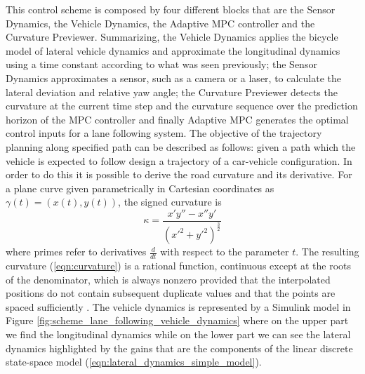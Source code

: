 This control scheme is composed by four different blocks that are the Sensor Dynamics, the Vehicle Dynamics, the Adaptive MPC controller and the Curvature Previewer.
Summarizing, the Vehicle Dynamics applies the bicycle model of lateral vehicle dynamics and approximate the longitudinal dynamics using a time constant according to what was seen previously; the Sensor Dynamics approximates a sensor, such as a camera or a laser, to calculate the lateral deviation and relative yaw angle; the Curvature Previewer detects the curvature at the current time step and the curvature sequence over the prediction horizon of the MPC controller and finally Adaptive MPC generates the optimal control inputs for a lane following system. The objective of the trajectory planning along specified path can be described as follows: given a path which the vehicle is expected to follow design a trajectory of a car-vehicle configuration.
In order to do this it is possible to derive the road curvature and its derivative.
For a plane curve given parametrically in Cartesian coordinates as $\gamma(t)=(x(t),y(t))$, the signed curvature is 
\begin{equation}
\label{eqn:curvature}
\kappa=\frac{x'y''-x''y'}{(x'^2+y'^2)^\frac{3}{2}}
\end{equation}
where primes refer to derivatives $\frac{d}{dt}$ with respect to the parameter $t$. The resulting curvature (\ref{eqn:curvature}) is a rational function, continuous except at the roots of the denominator, which is always nonzero provided that the interpolated positions do not contain subsequent duplicate values and that the points are spaced sufficiently \cite{longitudinal}.
The vehicle dynamics is represented by a Simulink model in Figure \ref{fig:scheme_lane_following_vehicle_dynamics}  where on the upper part we find the longitudinal dynamics while on the lower part we can see the lateral dynamics highlighted by the gains that are the components of the linear discrete state-space model (\ref{eqn:lateral_dynamics_simple_model}).
 
